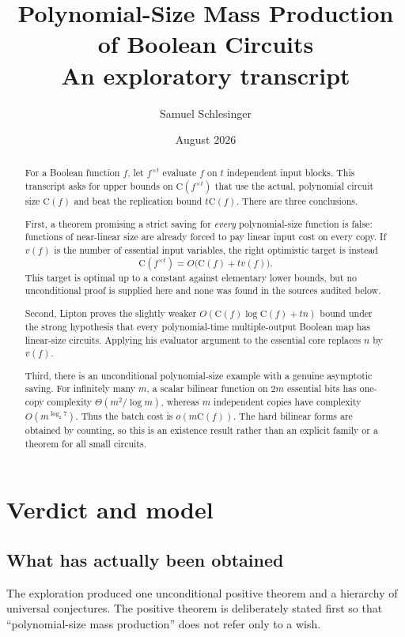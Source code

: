 \documentclass[11pt]{article}
\title{\textbf{Polynomial-Size Mass Production of Boolean Circuits}\\[0.35em]
\large An exploratory transcript}
\author{Samuel Schlesinger}
\date{August 2026}
\theoremstyle{definition}
\newcommand{\C}{\mathrm{C}}
\begin{document}
\maketitle

\begin{abstract}
For a Boolean function $f$, let $f^{\times t}$ evaluate $f$ on $t$
independent input blocks.  This transcript asks for upper bounds on
$\C(f^{\times t})$ that use the actual, polynomial circuit size $\C(f)$ and
beat the replication bound $t\C(f)$.  There are three conclusions.

First, a theorem promising a strict saving for \emph{every} polynomial-size
function is false: functions of near-linear size are already forced to pay
linear input cost on every copy.  If $v(f)$ is the number of essential input
variables, the right optimistic target is instead
\[
  \C(f^{\times t})=O\bigl(\C(f)+t v(f)\bigr).
\]
This target is optimal up to a constant against elementary lower bounds, but
no unconditional proof is supplied here and none was found in the sources
audited below.

Second, Lipton proves the slightly weaker
$O(\C(f)\log\C(f)+tn)$ bound under the strong hypothesis that every
polynomial-time multiple-output Boolean map has linear-size circuits.
Applying his evaluator argument to the essential core replaces $n$ by $v(f)$.

Third, there is an unconditional polynomial-size example with a genuine
asymptotic saving.  For infinitely many $m$, a scalar bilinear function on
$2m$ essential bits has one-copy complexity $\Theta(m^2/\log m)$, whereas
$m$ independent copies have complexity $O(m^{\log_2 7})$.  Thus the batch
cost is $o(m\C(f))$.  The hard bilinear forms are obtained by counting, so
this is an existence result rather than an explicit family or a theorem for
all small circuits.
\end{abstract}

\section{Verdict and model}

\subsection{What has actually been obtained}

The exploration produced one unconditional positive theorem and a hierarchy
of universal conjectures.  The positive theorem is deliberately stated first
so that ``polynomial-size mass production'' does not refer only to a wish.
\end{document}

